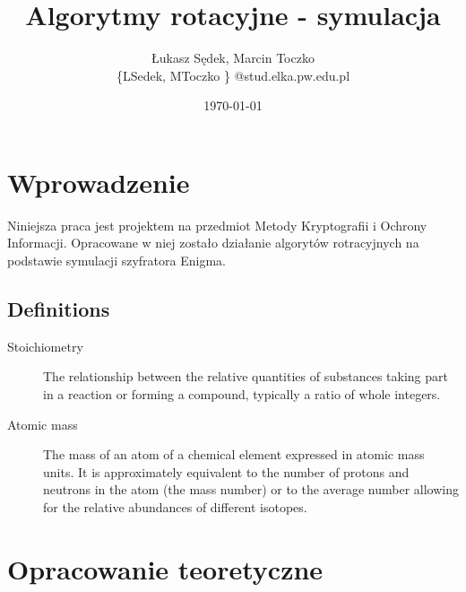 \documentclass[11pt,a4paper,polish]{article}
\title{Algorytmy rotacyjne - symulacja} %
\author{Łukasz Sędek, Marcin Toczko\\ \{LSedek, MToczko \} 
@stud.elka.pw.edu.pl}
\date{\today} %
\begin{document}
\maketitle %





\section{Wprowadzenie}

Niniejsza praca jest projektem na przedmiot Metody Kryptografii i Ochrony
Informacji. Opracowane w niej zostało działanie algorytów rotracyjnych na
podstawie symulacji szyfratora Enigma.


\subsection{Definitions}
\label{definitions}
\begin{description}
\item[Stoichiometry]
The relationship between the relative quantities of substances taking part in a reaction or forming a compound, typically a ratio of whole integers.
\item[Atomic mass]
The mass of an atom of a chemical element expressed in atomic mass units. It is approximately equivalent to the number of protons and neutrons in the atom (the mass number) or to the average number allowing for the relative abundances of different isotopes. 
\end{description} 
 

\section{Opracowanie teoretyczne}
\end{document}
